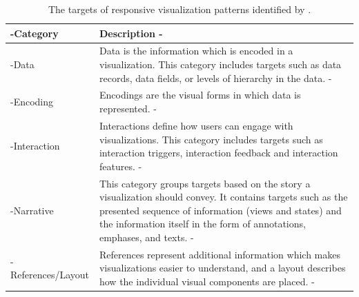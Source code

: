 \begin{table}[tp]
\tablestretch
{}
\centering
\begin{tabularx}{\linewidth}{>{\kern-\tabcolsep}lX<{\kern-\tabcolsep}}
\toprule
Category & Description \\
\midrule
Data & Data is the information which is encoded in a visualization. This category includes targets such as data records, data fields, or levels of hierarchy in the data. \\
Encoding & Encodings are the visual forms in which data is represented. \\
Interaction & Interactions define how users can engage with visualizations. This category includes targets such as interaction triggers, interaction feedback and interaction features. \\
Narrative & This category groups targets based on the story a visualization should convey. It contains targets such as the presented sequence of information (views and states) and the information itself in the form of annotations, emphases, and texts. \\
References/Layout & References represent additional information which makes visualizations easier to understand, and a layout describes how the individual visual components are placed. \\
\bottomrule
\end{tabularx}
\caption[Targets of Responsive Visualization Patterns]{
The targets of responsive visualization patterns identified by
\textcite{DesignPatternsTradeOffsRespVis}.
}
\label{tab:PatternsTargets}
\end{table}





